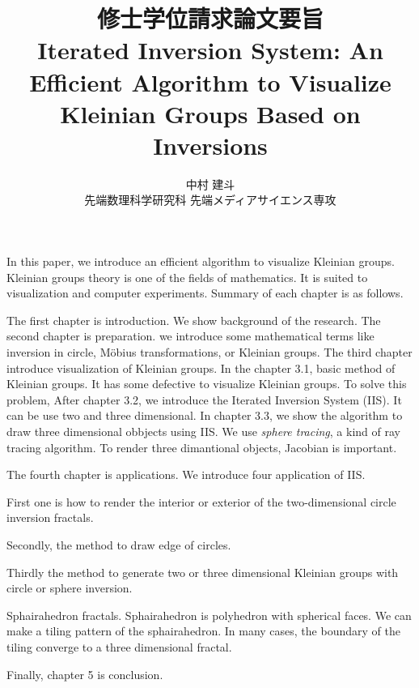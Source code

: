 \documentclass[uplatex, dvipdfmx]{article}
\title{修士学位請求論文要旨\\
 Iterated Inversion System: An Efficient Algorithm to Visualize Kleinian Groups Based on Inversions }
\author{中村 建斗\\
先端数理科学研究科 先端メディアサイエンス専攻\\
}
\date{}
\begin{document}
\maketitle
\pagestyle{plain}
\newpage

In this paper, we introduce an efficient algorithm to visualize Kleinian
groups.
Kleinian groups theory is one of the fields of mathematics.
It is suited to visualization and computer experiments.
Summary of each chapter is as follows.

The first chapter is introduction. 
We show background of the research.
The second chapter is preparation.
we introduce some mathematical terms like inversion in circle, 
M\"obius transformations, or Kleinian groups.
The third chapter introduce visualization of Kleinian groups.
In the chapter 3.1, basic method of Kleinian groups.
It has some defective to visualize Kleinian groups.
To solve this problem,
After chapter 3.2, we introduce the Iterated Inversion System (IIS).
It can be use two and three dimensional.
In chapter 3.3, we show the algorithm to draw three dimensional
obbjects using IIS.
We use \textit{sphere tracing}, a kind of ray tracing algorithm.
To render three dimantional objects, Jacobian is important.

The fourth chapter is applications.
We introduce four application of IIS.

First one is how to render the interior or exterior of the
two-dimensional circle inversion fractals.

Secondly, the method to draw edge of circles.

Thirdly
the method to generate two or three dimensional Kleinian groups with
circle or sphere inversion.

Sphairahedron fractals. Sphairahedron is polyhedron with spherical
faces. We can make a tiling pattern of the sphairahedron.
In many cases, the boundary of the tiling converge to a three
dimensional fractal. 


Finally, chapter 5 is conclusion.
\end{document}
